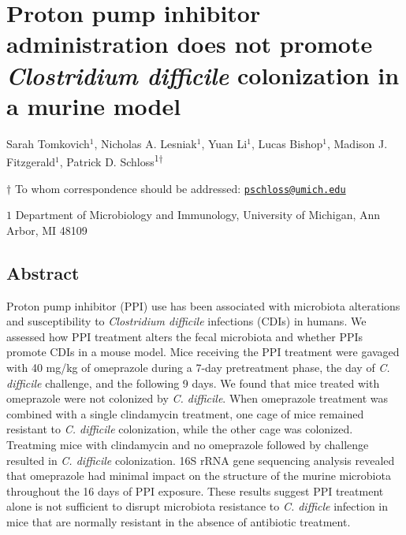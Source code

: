 \documentclass[11pt,]{article}
\title{}
\author{}
\date{}
\begin{document}
\vspace{35mm}

\section{\texorpdfstring{Proton pump inhibitor administration does not
promote \emph{Clostridium difficile} colonization in a murine
model}{Proton pump inhibitor administration does not promote Clostridium difficile colonization in a murine model}}\label{proton-pump-inhibitor-administration-does-not-promote-clostridium-difficile-colonization-in-a-murine-model}

\vspace{35mm}

Sarah Tomkovich\({^1}\), Nicholas A. Lesniak\({^1}\), Yuan Li\({^1}\),
Lucas Bishop\({^1}\), Madison J. Fitzgerald\({^1}\), Patrick D.
Schloss\textsuperscript{1\(\dagger\)}

\vspace{40mm}

\(\dagger\) To whom correspondence should be addressed:
\href{mailto:pschloss@umich.edu}{\nolinkurl{pschloss@umich.edu}}

\(1\) Department of Microbiology and Immunology, University of Michigan,
Ann Arbor, MI 48109

\newpage

\linenumbers

\subsection{Abstract}\label{abstract}

Proton pump inhibitor (PPI) use has been associated with microbiota
alterations and susceptibility to \emph{Clostridium difficile}
infections (CDIs) in humans. We assessed how PPI treatment alters the
fecal microbiota and whether PPIs promote CDIs in a mouse model. Mice
receiving the PPI treatment were gavaged with 40 mg/kg of omeprazole
during a 7-day pretreatment phase, the day of \emph{C. difficile}
challenge, and the following 9 days. We found that mice treated with
omeprazole were not colonized by \emph{C. difficile}. When omeprazole
treatment was combined with a single clindamycin treatment, one cage of
mice remained resistant to \emph{C. difficile} colonization, while the
other cage was colonized. Treatming mice with clindamycin and no
omeprazole followed by challenge resulted in \emph{C. difficile}
colonization. 16S rRNA gene sequencing analysis revealed that omeprazole
had minimal impact on the structure of the murine microbiota throughout
the 16 days of PPI exposure. These results suggest PPI treatment alone
is not sufficient to disrupt microbiota resistance to \emph{C. difficle}
infection in mice that are normally resistant in the absence of
antibiotic treatment.
\end{document}
